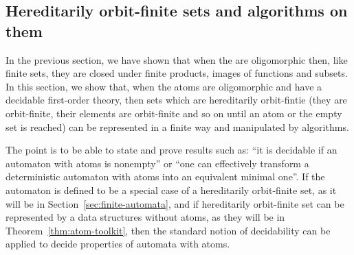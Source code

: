 


\subsection{Hereditarily orbit-finite sets and algorithms on them}
\label{sec:hof-expressions}
In the previous section, we have shown that when the are oligomorphic then, like finite sets, they are closed under finite products, images of functions and subsets. In this section, we show that, when the atoms are oligomorphic and have a decidable first-order theory, then sets which are hereditarily orbit-fintie (they are orbit-finite, their elements are orbit-finite and so on until an atom or the empty set is reached) can be represented in a finite way and manipulated by algorithms.

 The point is to be able to state and prove results such as: ``it is decidable if an automaton with atoms is nonempty'' or ``one can effectively transform a deterministic automaton with atoms into an equivalent minimal one''. If the automaton is defined to be a special case of a hereditarily orbit-finite set, as it will be in Section~\ref{sec:finite-automata}, and if hereditarily orbit-finite set can be represented by a data structures without atoms, as they will be in Theorem~\ref{thm:atom-toolkit}, then the standard notion of decidability can be applied to decide properties of automata with atoms. 




